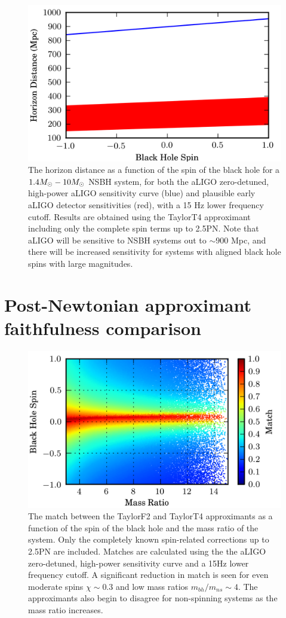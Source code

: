\begin{figure}
\begin{center}
\includegraphics[width=1.0	extwidth]{papers/nsbh_faithfulness/figure1.png}
\end{center}
\caption{\label{fig:t4horizon} 
The horizon distance as a function of the spin of the black hole 
for a $1.4M_\odot-10M_\odot$ \ac{NSBH} system, for both the \ac{aLIGO} zero-detuned,
high-power aLIGO sensitivity curve (blue) and plausible early \ac{aLIGO}
detector sensitivities (red), with a 15 Hz lower frequency cutoff. 
Results are obtained using the TaylorT4 approximant including only the 
complete spin terms up to 2.5\ac{PN}. Note that \ac{aLIGO} will be sensitive to
\ac{NSBH} systems out to $\sim 900$ Mpc, and there will be increased sensitivity
for systems with aligned black hole spins with large magnitudes. 
}
\end{figure}


\section{Post-Newtonian approximant faithfulness comparison}
\label{sec:faithfulness}

\begin{figure}
\begin{center}
\includegraphics[width=1.0	extwidth]{papers/nsbh_faithfulness/figure2.png}
\end{center}
\caption{\label{fig:f2f4f}The match between the TaylorF2 and
TaylorT4 approximants as a function of the spin of the black hole
and the mass ratio of the system. Only the completely known 
spin-related corrections up to 2.5\ac{PN} are included. Matches are calculated using the
the aLIGO zero-detuned, high-power sensitivity curve and a 15Hz lower frequency cutoff.
A significant reduction in match is seen for even moderate spins $\chi \sim 0.3$
and low mass ratios $m_{bh}/m_{ns} \sim 4$. The approximants also begin to disagree for non-spinning
systems as the mass ratio increases.
}


\end{figure}

